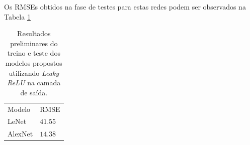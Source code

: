 Os RMSEs obtidos na fase de testes para estas redes podem ser observados na Tabela \ref{tab:results_leaky}

\begin{table}
     \caption{Resultados preliminares do treino e teste dos modelos propostos utilizando \emph{Leaky ReLU} na camada de saída.}
     \label{tab:results_leaky}
     \begin{tabular}{l l}
          Modelo & RMSE \\
          LeNet & $41.55$ \\
          AlexNet & $14.38$
     \end{tabular}
\end{table}
